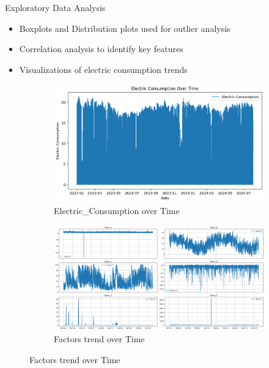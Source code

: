 \documentclass{beamer}
\begin{document}
\begin{frame}{Exploratory Data Analysis}
\begin{itemize}
    \item Boxplots and Distribution plots used for outlier analysis
    \item Correlation analysis to identify key features
    \item Visualizations of electric consumption trends
\end{itemize}
\begin{figure}
    \centering
    \begin{subfigure}[t]{0.48\textwidth}
        \includegraphics[width=\linewidth]{images/EC_Time.png}
        \caption{Electric\_Consumption over Time}
    \end{subfigure}
    \hfill
    \begin{subfigure}[t]{0.48\textwidth}
        \includegraphics[width=\linewidth]{images/Factors_Time.png}
        \caption{Factors trend over Time}
    \end{subfigure}
\end{figure}
\end{frame}
\end{document}
